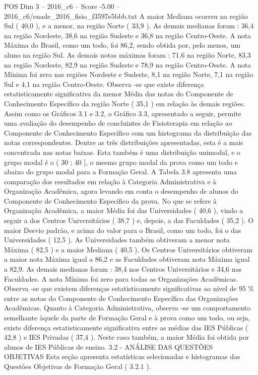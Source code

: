 \begin{textsample}{POS Dim 3 – 2016\_c6 – Score -5.00 – 2016\_c6/enade\_2016\_fisio\_f3597e5bbb.txt}
A maior Mediana ocorreu na região Sul ( 40,0 ), e a menor, na região Norte ( 33,9 ).
As demais medianas foram : 36,4 na região Nordeste, 38,6 na região Sudeste e 36,8 na região Centro-Oeste.
A nota Máxima do Brasil, como um todo, foi 86,2, sendo obtida por, pelo menos, um aluno na região Sul.
As demais notas máximas foram : 71,6 na região Norte, 83,3 na região Nordeste, 82,9 na região Sudeste e 78,9 na região Centro-Oeste.
A nota Mínima foi zero nas regiões Nordeste e Sudeste, 8,1 na região Norte, 7,1 na região Sul e 4,1 na região Centro-Oeste.
Observa -se que existe diferença estatisticamente significativa da menor Média das notas do Componente de Conhecimento Específico da região Norte ( 35,1 ) em relação às demais regiões.
Assim como os Gráficos 3.1 e 3.2, o Gráfico 3.3, apresentado a seguir, permite uma avaliação do desempenho de concluintes de Fisioterapia em relação ao Componente de Conhecimento Específico com um histograma da distribuição das notas correspondentes.
Dentre as três distribuições apresentadas, esta é a mais concentrada nas notas baixas.
Esta também é uma distribuição unimodal, e o grupo modal é o ( 30 ; 40 ], o mesmo grupo modal da prova como um todo e abaixo do grupo modal para a Formação Geral.
A Tabela 3.8 apresenta uma comparação dos resultados em relação à Categoria Administrativa e à Organização Acadêmica, agora levando em conta o desempenho de alunos do Componente de Conhecimento Específico da prova.
No que se refere à Organização Acadêmica, a maior Média foi das Universidades ( 40,6 ), vindo a seguir a dos Centros Universitários ( 38,7 ) e, depois, a das Faculdades ( 35,2 ).
O maior Desvio padrão, e acima do valor para o Brasil, como um todo, foi o das Universidades ( 12,5 ).
As Universidades também obtiveram a menor nota Máxima ( 82,5 ) e a maior Mediana ( 40,5 ).
Os Centros Universitários obtiveram a maior nota Máxima igual a 86,2 e as Faculdades obtiveram nota Máxima igual a 82,9.
As demais medianas foram : 38,4 nos Centros Universitários e 34,6 nas Faculdades.
A nota Mínima foi zero para todas as Organizações Acadêmicas.
Observa -se que existem diferenças estatisticamente significativas ao nível de 95 \% entre as notas do Componente de Conhecimento Específico das Organizações Acadêmicas.
Quanto à Categoria Administrativa, observa -se um comportamento semelhante àquele da parte de Formação Geral e à prova como um todo, ou seja, existe diferença estatisticamente significativa entre as médias das IES Públicas ( 42,8 ) e IES Privadas ( 37,4 ).
Neste caso também, a maior Média foi obtida por alunos de IES Públicas de ensino. 3.2 - ANÁLISE DAS QUESTÕES OBJETIVAS Esta seção apresenta estatísticas selecionadas e histogramas das Questões Objetivas de Formação Geral ( 3.2.1 ).

\end{textsample}
